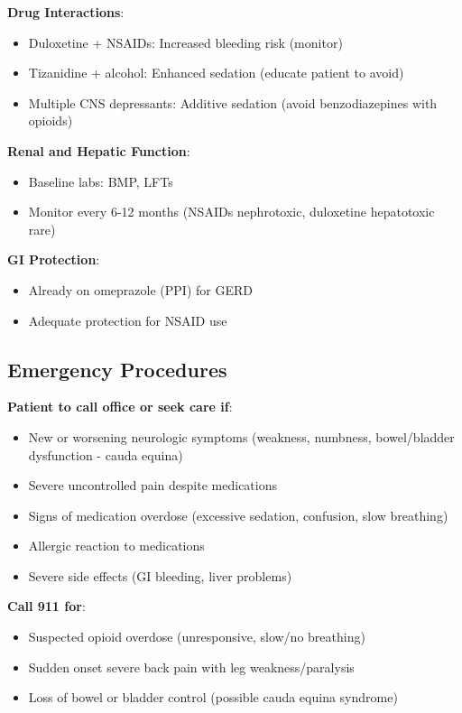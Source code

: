 \documentclass[11pt,letterpaper]{article}
\begin{document}
\textbf{Drug Interactions}:
\begin{itemize}[leftmargin=*]
    \item Duloxetine + NSAIDs: Increased bleeding risk (monitor)
    \item Tizanidine + alcohol: Enhanced sedation (educate patient to avoid)
    \item Multiple CNS depressants: Additive sedation (avoid benzodiazepines with opioids)
\end{itemize}

\textbf{Renal and Hepatic Function}:
\begin{itemize}[leftmargin=*]
    \item Baseline labs: BMP, LFTs
    \item Monitor every 6-12 months (NSAIDs nephrotoxic, duloxetine hepatotoxic rare)
\end{itemize}

\textbf{GI Protection}:
\begin{itemize}[leftmargin=*]
    \item Already on omeprazole (PPI) for GERD
    \item Adequate protection for NSAID use
\end{itemize}

\subsection*{Emergency Procedures}

\textbf{Patient to call office or seek care if}:
\begin{itemize}[leftmargin=*]
    \item New or worsening neurologic symptoms (weakness, numbness, bowel/bladder dysfunction - cauda equina)
    \item Severe uncontrolled pain despite medications
    \item Signs of medication overdose (excessive sedation, confusion, slow breathing)
    \item Allergic reaction to medications
    \item Severe side effects (GI bleeding, liver problems)
\end{itemize}

\textbf{Call 911 for}:
\begin{itemize}[leftmargin=*]
    \item Suspected opioid overdose (unresponsive, slow/no breathing)
    \item Sudden onset severe back pain with leg weakness/paralysis
    \item Loss of bowel or bladder control (possible cauda equina syndrome)
\end{itemize}
\end{document}
